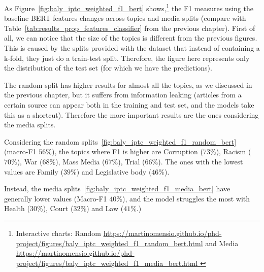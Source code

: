 As Figure~\ref{fig:baly_iptc_weighted_f1_bert} shows,\footnote{Interactive charts: Random \url{https://martinomensio.github.io/phd-project/figures/baly_iptc_weighted_f1_random_bert.html} and Media \url{https://martinomensio.github.io/phd-project/figures/baly_iptc_weighted_f1_media_bert.html }} the F1 measures using the baseline BERT features changes across topics and media splits (compare with Table~\ref{tab:results_prop_features_classifier} from the previous chapter).
First of all, we can notice that the size of the topics is different from the previous figures. This is caused by the splits provided with the dataset that instead of containing a k-fold, they just do a train-test split. Therefore, the figure here represents only the distribution of the test set (for which we have the predictions).

The random split has higher results for almost all the topics, as we discussed in the previous chapter, but it suffers from information leaking (articles from a certain source can appear both in the training and test set, and the models take this as a shortcut).
Therefore the more important results are the ones considering the media splits.

Considering the random splits~\ref{fig:baly_iptc_weighted_f1_random_bert} (macro-F1 $56\%$), the topics where F1 is higher are Corruption ($73\%$), Racism ($70\%$), War ($68\%$), Mass Media ($67\%$), Trial ($66\%$). The ones with the lowest values are Family ($39\%$) and Legislative body ($46\%$).

Instead, the media splits~\ref{fig:baly_iptc_weighted_f1_media_bert} have generally lower values (Macro-F1 $40\%$), and the model struggles the most with Health ($30\%$), Court ($32\%$) and Law ($41\%$.)

